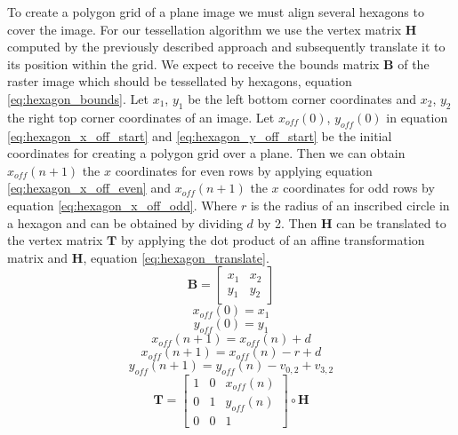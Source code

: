 		To create a polygon grid of a plane image we must align several hexagons to cover the image. For our tessellation algorithm we use the vertex matrix $\mathbf{H}$ computed by the previously described approach and subsequently translate it to its position within the grid. We expect to receive the bounds matrix $\mathbf{B}$ of the raster image which should be tessellated by hexagons, equation \ref{eq:hexagon_bounds}. Let $x_1$, $y_1$ be the left bottom corner coordinates and $x_2$, $y_2$ the right top corner coordinates of an image. Let $x_{off}(0)$, $y_{off}(0)$ in equation \ref{eq:hexagon_x_off_start} and \ref{eq:hexagon_y_off_start} be the initial coordinates for creating a polygon grid over a plane. Then we can obtain $x_{off}(n+1)$ the $x$ coordinates for even rows by applying equation \ref{eq:hexagon_x_off_even} and $x_{off}(n+1)$ the $x$ coordinates for odd rows by equation \ref{eq:hexagon_x_off_odd}. Where $r$ is the radius of an inscribed circle in a hexagon and can be obtained by dividing $d$ by 2. Then $\mathbf{H}$ can be translated to the vertex matrix $\mathbf{T}$ by applying the dot product of an affine transformation matrix and $\mathbf{H}$, equation \ref{eq:hexagon_translate}.
		\begin{equation}
		\label{eq:hexagon_bounds}
			\mathbf{B} =
				\begin{bmatrix}
				x_1 & x_2 \\
				y_1 & y_2
			\end{bmatrix}
		\end{equation}
		\begin{equation}
		\label{eq:hexagon_x_off_start}
			x_{off}(0)=x_1
		\end{equation}
		\begin{equation}
		\label{eq:hexagon_y_off_start}
			y_{off}(0)=y_1
		\end{equation}
		\begin{equation}
		\label{eq:hexagon_x_off_even}
			x_{off}(n+1)=x_{off}(n)+d
		\end{equation}
		\begin{equation}
		\label{eq:hexagon_x_off_odd}
			x_{off}(n+1)=x_{off}(n)-r+d
		\end{equation}
		\begin{equation}
		\label{eq:hexagon_y_off}
			y_{off}(n+1)=y_{off}(n)-v_{0,2}+v_{3,2}
		\end{equation}
		\begin{equation}
		\label{eq:hexagon_translate}
		\mathbf{T} =
			\begin{bmatrix}
				1 & 0 & x_{off}(n) \\
				0 & 1 & y_{off}(n) \\
				0 & 0 & 1
			\end{bmatrix} \circ \mathbf{H}
		\end{equation}

